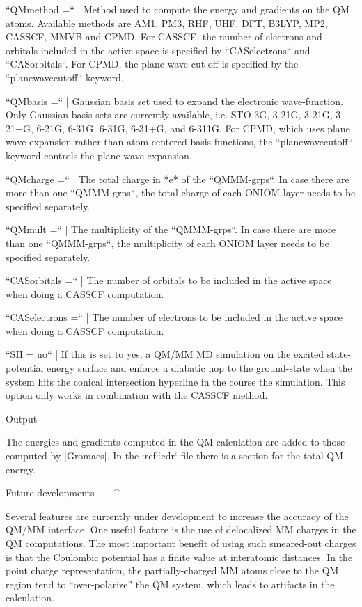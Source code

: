 ``QMmethod =``
    | Method used to compute the energy and gradients on the QM atoms.
      Available methods are AM1, PM3, RHF, UHF, DFT, B3LYP, MP2, CASSCF,
      MMVB and CPMD. For CASSCF, the number of electrons and orbitals
      included in the active space is specified by
      ``CASelectrons`` and ``CASorbitals``. For
      CPMD, the plane-wave cut-off is specified by the
      ``planewavecutoff`` keyword.

``QMbasis =``
    | Gaussian basis set used to expand the electronic wave-function.
      Only Gaussian basis sets are currently available, i.e. STO-3G,
      3-21G, 3-21G\*, 3-21+G\*, 6-21G, 6-31G, 6-31G\*, 6-31+G\*, and
      6-311G. For CPMD, which uses plane wave expansion rather than
      atom-centered basis functions, the ``planewavecutoff``
      keyword controls the plane wave expansion.

``QMcharge =``
    | The total charge in *e* of the ``QMMM-grps``. In case
      there are more than one ``QMMM-grps``, the total
      charge of each ONIOM layer needs to be specified separately.

``QMmult =``
    | The multiplicity of the ``QMMM-grps``. In case there
      are more than one ``QMMM-grps``, the multiplicity of
      each ONIOM layer needs to be specified separately.

``CASorbitals =``
    | The number of orbitals to be included in the active space when
      doing a CASSCF computation.

``CASelectrons =``
    | The number of electrons to be included in the active space when
      doing a CASSCF computation.

``SH = no``
    | If this is set to yes, a QM/MM MD simulation on the excited
      state-potential energy surface and enforce a diabatic hop to the
      ground-state when the system hits the conical intersection
      hyperline in the course the simulation. This option only works in
      combination with the CASSCF method.

Output
^^^^^^

The energies and gradients computed in the QM calculation are added to
those computed by |Gromacs|. In the :ref:`edr` file there is a
section for the total QM energy.

Future developments
^^^^^^^^^^^^^^^^^^^

Several features are currently under development to increase the
accuracy of the QM/MM interface. One useful feature is the use of
delocalized MM charges in the QM computations. The most important
benefit of using such smeared-out charges is that the Coulombic
potential has a finite value at interatomic distances. In the point
charge representation, the partially-charged MM atoms close to the QM
region tend to “over-polarize” the QM system, which leads to artifacts
in the calculation.

